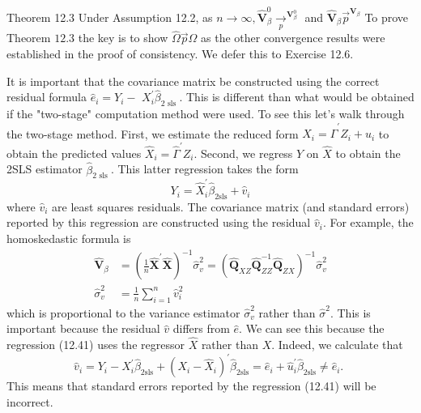 \documentclass[10pt]{article}
\begin{document}
Theorem 12.3 Under Assumption 12.2, as $n \rightarrow \infty, \widehat{\boldsymbol{V}}_{\beta}^{0}{\underset{p}{\longrightarrow}}^{\boldsymbol{V}_{\beta}^{0}}$ and $\widehat{\boldsymbol{V}}_{\beta} \vec{p}^{\boldsymbol{V}_{\beta}}$ To prove Theorem $12.3$ the key is to show $\widehat{\Omega} \vec{p} \Omega$ as the other convergence results were established in the proof of consistency. We defer this to Exercise 12.6.

It is important that the covariance matrix be constructed using the correct residual formula $\widehat{e}_{i}=Y_{i}-$ $X_{i}^{\prime} \widehat{\beta}_{2 \text { sls }}$. This is different than what would be obtained if the "two-stage" computation method were used. To see this let's walk through the two-stage method. First, we estimate the reduced form $X_{i}=\widehat{\Gamma}^{\prime} Z_{i}+\widehat{u}_{i}$ to obtain the predicted values $\widehat{X}_{i}=\widehat{\Gamma}^{\prime} Z_{i}$. Second, we regress $Y$ on $\widehat{X}$ to obtain the 2SLS estimator $\widehat{\beta}_{2 \text { sls }}$. This latter regression takes the form
$$
Y_{i}=\widehat{X}_{i}^{\prime} \widehat{\beta}_{2 \mathrm{sls}}+\widehat{v}_{i}
$$
where $\widehat{v}_{i}$ are least squares residuals. The covariance matrix (and standard errors) reported by this regression are constructed using the residual $\widehat{v}_{i}$. For example, the homoskedastic formula is
$$
\begin{aligned}
\widehat{\boldsymbol{V}}_{\beta} &=\left(\frac{1}{n} \widehat{\boldsymbol{X}}^{\prime} \widehat{\boldsymbol{X}}\right)^{-1} \widehat{\sigma}_{v}^{2}=\left(\widehat{\boldsymbol{Q}}_{X Z} \widehat{\boldsymbol{Q}}_{Z Z}^{-1} \widehat{\mathbf{Q}}_{Z X}\right)^{-1} \widehat{\sigma}_{v}^{2} \\
\widehat{\sigma}_{v}^{2} &=\frac{1}{n} \sum_{i=1}^{n} \widehat{v}_{i}^{2}
\end{aligned}
$$
which is proportional to the variance estimator $\widehat{\sigma}_{v}^{2}$ rather than $\widehat{\sigma}^{2}$. This is important because the residual $\widehat{v}$ differs from $\widehat{e}$. We can see this because the regression (12.41) uses the regressor $\widehat{X}$ rather than $X$. Indeed, we calculate that
$$
\widehat{v}_{i}=Y_{i}-X_{i}^{\prime} \widehat{\beta}_{2 \mathrm{sls}}+\left(X_{i}-\widehat{X}_{i}\right)^{\prime} \widehat{\beta}_{2 \mathrm{sls}}=\widehat{e}_{i}+\widehat{u}_{i}^{\prime} \widehat{\beta}_{2 \mathrm{sls}} \neq \widehat{e}_{i} \text {. }
$$
This means that standard errors reported by the regression (12.41) will be incorrect.
\end{document}
